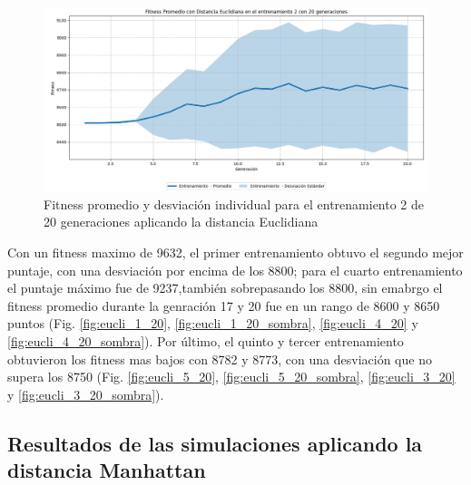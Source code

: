 \documentclass[conference]{IEEEtran}
\begin{document}
\begin{figure}[H]
    \centering
    \includegraphics[width=1\linewidth]{Euclidiana/Fitness_individual_20/Fitness_2_Eucli_20Gen_Sombra.png}
    \caption{Fitness promedio y desviación individual para el entrenamiento 2 de 20 generaciones aplicando la distancia Euclidiana}
    \label{fig:Fitnes_ecu_2_20_inv_sombra}
\end{figure}
Con un fitness maximo de 9632, el primer entrenamiento obtuvo el segundo mejor puntaje, con una desviación por encima de los 8800; para el cuarto entrenamiento el puntaje máximo fue de 9237,también sobrepasando los 8800, sin emabrgo el fitness promedio durante la genración 17 y 20 fue en un rango de 8600 y 8650 puntos (Fig. \ref{fig:eucli_1_20}, \ref{fig:eucli_1_20_sombra}, \ref{fig:eucli_4_20} y \ref{fig:eucli_4_20_sombra}). Por último, el quinto y tercer entrenamiento obtuvieron los fitness mas bajos con 8782 y 8773, con una desviación que no supera los 8750 (Fig. \ref{fig:eucli_5_20}, \ref{fig:eucli_5_20_sombra}, \ref{fig:eucli_3_20} y \ref{fig:eucli_3_20_sombra}).


\subsection{Resultados de las simulaciones aplicando la distancia Manhattan}
\end{document}
